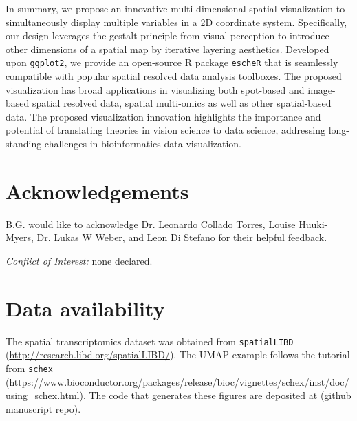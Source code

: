 \documentclass[11pt]{article}
\newcommand{\fixme}[1]{{\color{red} (#1)}}
\begin{document}
\vspace{0.45in}
In summary, we propose an innovative multi-dimensional spatial visualization to simultaneously display multiple variables in a 2D coordinate system. Specifically, our design leverages the gestalt principle from visual perception to introduce other dimensions of a spatial map by iterative layering aesthetics. Developed upon \texttt{ggplot2}, we provide an open-source R package \texttt{escheR} that is seamlessly compatible with popular spatial resolved data analysis toolboxes. The proposed visualization has broad applications in visualizing both spot-based and image-based spatial resolved data, spatial multi-omics as well as other spatial-based data. The proposed visualization innovation highlights the importance and potential of translating theories in vision science to data science, addressing long-standing challenges in bioinformatics data visualization.







\section*{Acknowledgements}
B.G. would like to acknowledge Dr. Leonardo Collado Torres, Louise Huuki-Myers, Dr. Lukas W Weber, and Leon Di Stefano for their helpful feedback.

\vspace{0.2in}
\noindent \textit{Conflict of Interest:} none declared.

\section*{Data availability}
The spatial transcriptomics dataset was obtained from \texttt{spatialLIBD} (\url{http://research.libd.org/spatialLIBD/}). The UMAP example follows the tutorial from \texttt{schex} (\url{https://www.bioconductor.org/packages/release/bioc/vignettes/schex/inst/doc/using_schex.html}). The code that generates these figures are deposited at \fixme{github manuscript repo}.
\end{document}
